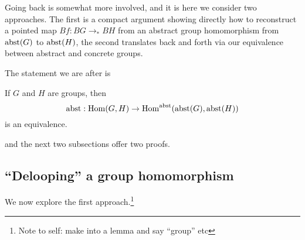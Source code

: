 Going back is somewhat more involved, and it is here we consider two approaches.
The first is a compact argument showing directly how to reconstruct a pointed map $Bf:BG\to_*BH$ from an abstract group homomorphism from $\mathrm{abst}(G)$ to $\mathrm{abst}(H)$, the second translates back and forth via our equivalence between abstract and concrete groups.



The statement we are after is


\begin{lemma}
  \label{lem:homomabstrconcr}
  If $G$ and $H$ are groups, then 
$$\mathrm{abst}:\mathrm{Hom}(G,H)\to\mathrm{Hom}^{\mathrm{abst}}(\mathrm{abst}(G),\mathrm{abst}(H))$$
is an equivalence.
\end{lemma}
and the next two subsections offer two proofs.



\subsection{``Delooping'' a group homomorphism}
\label{sec:thierrysdelooping}
We now explore the first approach.\footnote{Note to self: make into a lemma and say ``group'' etc}

